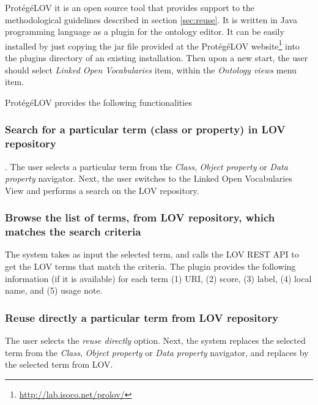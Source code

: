 Prot{\'e}g{\'e}LOV it is an open source tool that provides support to the methodological guidelines described in section \ref{sec:reuse}. It is written in Java programming language as a plugin for the \protege ontology editor. It can be easily installed by just copying the jar file provided at the Prot{\'e}g{\'e}LOV website\footnote{\url{http://lab.isoco.net/prolov/}} into the plugins directory of an existing \protege installation. Then upon a new start, the user should select \emph{Linked Open Vocabularies} item, within the \emph{Ontology views} menu item.

Prot{\'e}g{\'e}LOV provides the following functionalities 

\subsubsection{Search for a particular term (class or property) in LOV repository}. 
The user selects a particular term from the \emph{Class}, \emph{Object property} or \emph{Data property} navigator. 
Next, the user switches to the Linked Open Vocabularies View and performs a search on the LOV repository.

\subsubsection{Browse the list of terms, from LOV repository, which matches the search criteria}
The system takes as input the selected term, and calls the LOV REST API to get the LOV terms that match the criteria.
The plugin provides the following information (if it is available) for each term (1) URI, (2) score, (3) label, (4) local name, and (5) usage note.

\subsubsection{Reuse directly a particular term from LOV repository}
The user selects the \emph{reuse directly} option. Next, the system replaces the selected term from the \emph{Class}, \emph{Object property} or \emph{Data property} navigator, and replaces by the selected term from LOV. 

